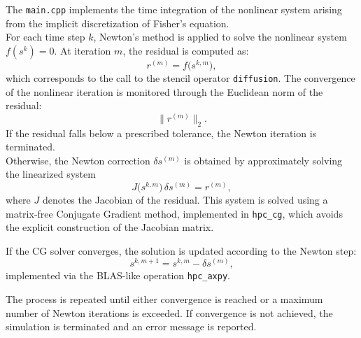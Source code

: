 \documentclass[unicode,10pt,a4paper,oneside,numbers=endperiod,openany]{scrartcl}
\begin{document}
The \texttt{main.cpp} implements the time integration of the nonlinear system arising from the implicit discretization of Fisher's equation.\\
For each time step $k$, Newton's method is applied to solve the nonlinear system \(f(s^k)=0\). At iteration \(m\), the residual is computed as:
\[
r^{(m)} = f\bigl(s^{k,m}\bigr),
\]
which corresponds to the call to the stencil operator \texttt{diffusion}. The convergence of the nonlinear iteration is monitored through the Euclidean norm of the residual:
\[
\|r^{(m)}\|_2.
\]
If the residual falls below a prescribed tolerance, the Newton iteration is terminated.\\
Otherwise, the Newton correction \(\delta s^{(m)}\) is obtained by approximately solving the linearized system
\[
J\bigl(s^{k,m}\bigr)\,\delta s^{(m)} = r^{(m)},
\]
where \(J\) denotes the Jacobian of the residual. This system is solved using a matrix-free Conjugate Gradient method, implemented in \texttt{hpc\_cg}, which avoids the explicit construction of the Jacobian matrix.

If the CG solver converges, the solution is updated according to the Newton step:
\[
s^{k,m+1} = s^{k,m} - \delta s^{(m)},
\]
implemented via the BLAS-like operation \texttt{hpc\_axpy}.

The process is repeated until either convergence is reached or a maximum number of Newton iterations is exceeded. If convergence is not achieved, the simulation is terminated and an error message is reported.
\end{document}
